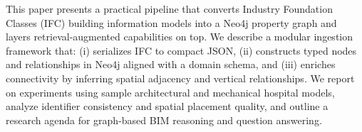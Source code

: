 This paper presents a practical pipeline that converts Industry Foundation Classes (IFC) building information models into a Neo4j property graph and layers retrieval-augmented capabilities on top. We describe a modular ingestion framework that: (i) serializes IFC to compact JSON, (ii) constructs typed nodes and relationships in Neo4j aligned with a domain schema, and (iii) enriches connectivity by inferring spatial adjacency and vertical relationships. We report on experiments using sample architectural and mechanical hospital models, analyze identifier consistency and spatial placement quality, and outline a research agenda for graph-based BIM reasoning and question answering.

